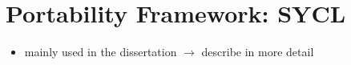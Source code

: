 \section{Portability Framework: SYCL}

\begin{itemize}
    \item mainly used in the dissertation $\rightarrow$ describe in more detail
\end{itemize}
